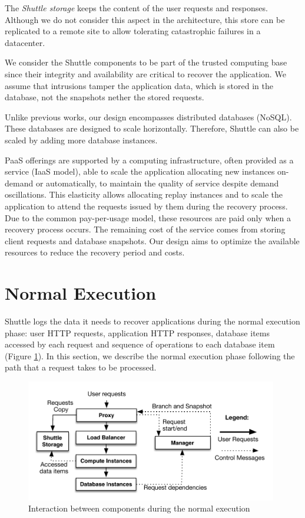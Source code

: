The \emph{Shuttle storage} keeps the content of the user requests and responses. Although we do not consider this aspect in the architecture, this store can be replicated to a remote site to allow tolerating catastrophic failures in a datacenter.


We consider the Shuttle components to be part of the trusted computing base since their integrity and availability are critical to recover the application. We assume that intrusions tamper the application data, which is stored in the database, not the snapshots nether the stored requests. 

Unlike previous works, our design encompasses distributed databases (\acs{NoSQL}). These databases are designed to scale horizontally. Therefore, Shuttle can also be scaled by adding more database instances.

PaaS offerings are supported by a computing infrastructure, often provided as a service (IaaS model), able to scale the application allocating new instances on-demand or automatically, to maintain the quality of service despite demand oscillations. This elasticity  allows allocating replay instances and to scale the application to attend the requests issued by them during the recovery process. Due to the common pay-per-usage model, these resources are paid only when a recovery process occurs. The remaining cost of the service comes from storing client requests and database snapshots. Our design aims to optimize the available resources to reduce the recovery period and costs. 


\section{Normal Execution}
\label{sec:arch:normal_execution}
Shuttle logs the data it needs to recover applications during the normal execution phase: user \ac{HTTP} requests, application \ac{HTTP} responses, database items accessed by each request and sequence of operations to each database item (Figure \ref{fig:normal_execution}). In this section, we describe the normal execution phase following the path that a request takes to be processed.

\begin{figure}
\centering
\includegraphics[width=110mm]{images/normalExecution}
\caption{Interaction between components during the normal execution}
\label{fig:normal_execution}
\end{figure}

